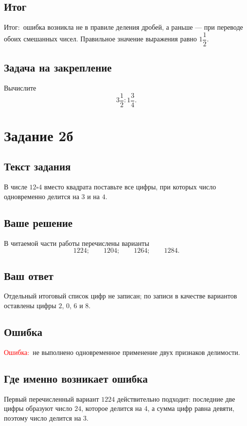 \documentclass[12pt,a4paper]{article}
\newcommand{\ErrorLabel}{\textcolor{red}{Ошибка:}}
\newcommand{\Outcome}{\textcolor{teal!60!black}{Итог:}}
\begin{document}
\subsection*{Итог}
\Outcome\ ошибка возникла не в правиле деления дробей, а раньше --- при переводе обоих смешанных чисел. Правильное значение выражения равно $1\dfrac12$.

\subsection*{Задача на закрепление}
Вычислите
\[
3\frac12:1\frac34.
\]

\newpage
{}\label{task:2b}
\section*{Задание 2б}

\subsection*{Текст задания}
В числе $12\square4$ вместо квадрата поставьте все цифры, при которых число одновременно делится на $3$ и на $4$.

\subsection*{Ваше решение}
В читаемой части работы перечислены варианты
\[
1224;\qquad 1204;\qquad 1264;\qquad 1284.
\]

\subsection*{Ваш ответ}
Отдельный итоговый список цифр не записан; по записи в качестве вариантов оставлены цифры $2$, $0$, $6$ и $8$.

\subsection*{Ошибка}
\ErrorLabel\ не выполнено одновременное применение двух признаков делимости.

\subsection*{Где именно возникает ошибка}
Первый перечисленный вариант $1224$ действительно подходит: последние две цифры образуют число $24$, которое делится на $4$, а сумма цифр равна девяти, поэтому число делится на $3$.
\end{document}
